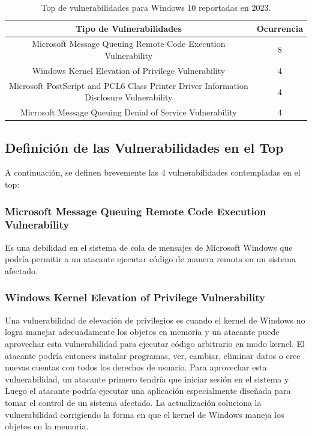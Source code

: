 \documentclass[stu, 11pt, letterpaper, donotrepeattitle, floatsintext, natbib]{apa7}
\begin{document}
\begin{table}[H]
    \caption{Top de vulnerabilidades para Windows 10 reportadas en 2023.}
    \centering
    \begin{tabular}{cc} %
        \hline 
         Tipo de Vulnerabilidades & Ocurrencia\\
         \hline
         Microsoft Message Queuing Remote Code Execution Vulnerability & 8\\
          Windows Kernel Elevation of Privilege Vulnerability & 4\\
	Microsoft PostScript and PCL6 Class Printer Driver Information Disclosure Vulnerability & 4\\
	Microsoft Message Queuing Denial of Service Vulnerability & 4\\
         \hline
    \end{tabular}
    \label{tab:table_words}
\end{table}

\subsection{Definición de las Vulnerabilidades en el Top} 

A continuación, se definen brevemente las 4 vulnerabilidades contempladas en el top:

\subsubsection{Microsoft Message Queuing Remote Code Execution Vulnerability}

Es una debilidad en el sistema de cola de mensajes de Microsoft Windows que podría permitir a un atacante ejecutar código de manera remota en un sistema afectado.

\subsubsection{Windows Kernel Elevation of Privilege Vulnerability}

Una vulnerabilidad de elevación de privilegios es cuando el kernel de Windows no logra manejar adecuadamente los objetos en memoria y un atacante puede aprovechar esta vulnerabilidad para ejecutar código arbitrario en modo kernel. El atacante podría entonces instalar programas, ver, cambiar, eliminar datos o cree nuevas cuentas con todos los derechos de usuario. Para aprovechar esta vulnerabilidad, un atacante primero tendría que iniciar sesión en el sistema y Luego el atacante podría ejecutar una aplicación especialmente diseñada para tomar el control de un sistema afectado. La actualización soluciona la vulnerabilidad corrigiendo la forma en que el kernel de Windows maneja los objetos en la memoria.
\end{document}
